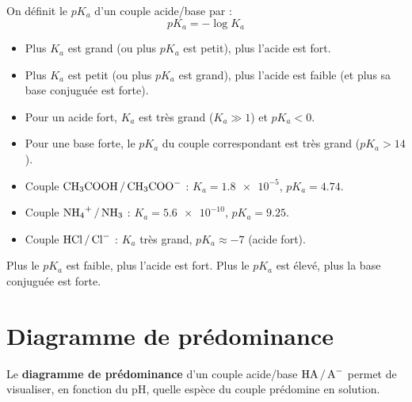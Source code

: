 \begin{definition}[$pK_a$]
On définit le $pK_a$ d'un couple acide/base par :
\[
\boxed{pK_a = -\log K_a}
\]
\end{definition}

\begin{propriete}
\begin{itemize}
    \item Plus $K_a$ est grand (ou plus $pK_a$ est petit), plus l'acide est fort.
    \item Plus $K_a$ est petit (ou plus $pK_a$ est grand), plus l'acide est faible (et plus sa base conjuguée est forte).
    \item Pour un acide fort, $K_a$ est très grand ($K_a \gg 1$) et $pK_a < 0$.
    \item Pour une base forte, le $pK_a$ du couple correspondant est très grand ($pK_a > 14$).
\end{itemize}
\end{propriete}

\begin{exemple}
\begin{itemize}
    \item Couple $\ce{CH3COOH / CH3COO-}$ : $K_a = \num{1.8e-5}$, $pK_a = 4.74$.
    \item Couple $\ce{NH4+ / NH3}$ : $K_a = \num{5.6e-10}$, $pK_a = 9.25$.
    \item Couple $\ce{HCl / Cl-}$ : $K_a$ très grand, $pK_a \approx -7$ (acide fort).
\end{itemize}
\end{exemple}

\begin{remarque}
Plus le $pK_a$ est faible, plus l'acide est fort. Plus le $pK_a$ est élevé, plus la base conjuguée est forte.
\end{remarque}

\section{Diagramme de prédominance}

\begin{definition}
Le \textbf{diagramme de prédominance} d'un couple acide/base $\ce{HA / A-}$ permet de visualiser, en fonction du pH, quelle espèce du couple prédomine en solution.
\end{definition}

